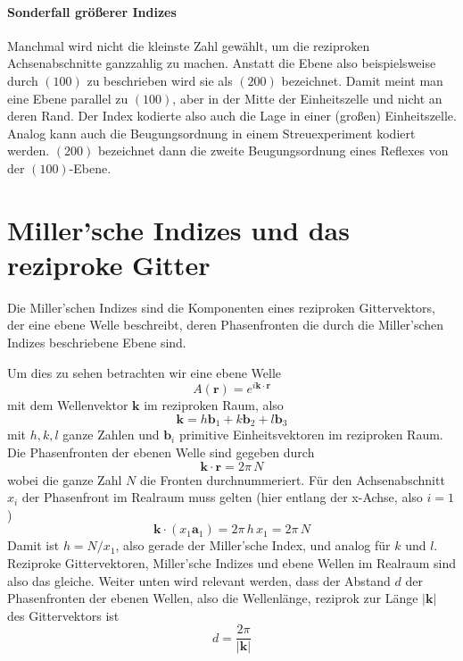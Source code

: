 \paragraph{Sonderfall größerer Indizes} Manchmal wird nicht die kleinste Zahl gewählt, um die reziproken Achsenabschnitte ganzzahlig zu machen. Anstatt die Ebene also beispielsweise durch $(100)$ zu beschrieben wird sie als $(200)$ bezeichnet. Damit meint man eine Ebene parallel zu $(100)$, aber in der Mitte der Einheitszelle und nicht an deren Rand. Der Index kodierte also auch die Lage in einer (großen) Einheitszelle. Analog kann auch die Beugungsordnung in einem Streuexperiment kodiert werden. $(200)$  bezeichnet dann die zweite Beugungsordnung eines Reflexes von der $(100)$-Ebene.


\section{Miller'sche Indizes und das reziproke Gitter}

Die Miller'schen Indizes sind die Komponenten eines reziproken Gittervektors, der eine ebene Welle beschreibt, deren Phasenfronten die durch die Miller'schen Indizes beschriebene Ebene sind.

Um dies zu sehen betrachten wir eine ebene Welle 
\begin{equation}
 A(\mathbf{r}) = e^{i \mathbf{k} \cdot \mathbf{r}}
\end{equation}
mit dem Wellenvektor $\mathbf{k}$ im reziproken Raum, also
\begin{equation}
\mathbf{k} = h \mathbf{b}_1 + k \mathbf{b}_2  +l  \mathbf{b}_3 
\end{equation}
mit $h,k,l$ ganze Zahlen und $ \mathbf{b}_i$ primitive Einheitsvektoren im reziproken Raum. Die Phasenfronten der ebenen Welle sind gegeben durch
\begin{equation}
\mathbf{k} \cdot \mathbf{r} = 2 \pi \, N
\end{equation}
wobei die ganze Zahl $N$ die Fronten durchnummeriert. Für den Achsenabschnitt $x_i$ der Phasenfront im Realraum muss gelten (hier entlang der x-Achse, also $i=1$)
\begin{equation}
 \mathbf{k} \cdot (x_1 \mathbf{a}_1) = 2 \pi \, h \, x_1 = 2 \pi \, N
\end{equation}
Damit ist $h = N / x_1$, also gerade der Miller'sche Index, und analog für $k$ und $l$. Reziproke Gittervektoren, Miller'sche Indizes und ebene Wellen im Realraum sind also das gleiche. Weiter unten wird relevant werden, dass der Abstand $d$  der Phasenfronten der ebenen Wellen, also die Wellenlänge, reziprok zur Länge $| \mathbf{k} |$ des Gittervektors ist
\begin{equation}
 d = \frac{2 \pi}{| \mathbf{k} |}
\end{equation}


